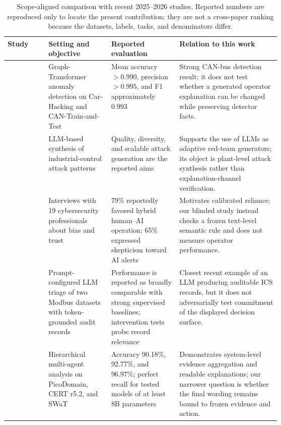 \begin{table}[!htbp]
\centering
\caption{Scope-aligned comparison with recent 2025--2026 studies. Reported numbers are reproduced only to locate the present contribution; they are not a cross-paper ranking because the datasets, labels, tasks, and denominators differ.}
\label{tab:recent-comparison}
\scriptsize
\renewcommand{\arraystretch}{1.04}
\setlength{\tabcolsep}{3pt}
\begin{tabularx}{\linewidth}{@{}p{0.15\linewidth}p{0.23\linewidth}p{0.25\linewidth}X@{}}
\toprule
Study & Setting and objective & Reported evaluation & Relation to this work \\
\midrule
\citet{zhou2025cgts} & Graph-Transformer anomaly detection on Car-Hacking and CAN-Train-and-Test & Mean accuracy $>0.990$, precision $>0.995$, and F1 approximately $0.993$ & Strong CAN-bus detection result; it does not test whether a generated operator explanation can be changed while preserving detector facts. \\
\addlinespace[2pt]
\citet{ahmed2025attackllm} & LLM-based synthesis of industrial-control attack patterns & Quality, diversity, and scalable attack generation are the reported aims & Supports the use of LLMs as adaptive red-team generators; its object is plant-level attack synthesis rather than explanation-channel verification. \\
\addlinespace[2pt]
\citet{hagen2025human} & Interviews with 19 cybersecurity professionals about bias and trust & 79\% reportedly favored hybrid human--AI operation; 65\% expressed skepticism toward AI alerts & Motivates calibrated reliance; our blinded study instead checks a frozen text-level semantic rule and does not measure operator performance. \\
\addlinespace[2pt]
\citet{kong2026llm} & Prompt-configured LLM triage of two Modbus datasets with token-grounded audit records & Performance is reported as broadly comparable with strong supervised baselines; intervention tests probe record relevance & Closest recent example of an LLM producing auditable ICS records, but it does not adversarially test commitment of the displayed decision surface. \\
\addlinespace[2pt]
\citet{ferraro2026multiagent} & Hierarchical multi-agent analysis on PicoDomain, CERT r5.2, and SWaT & Accuracy 90.18\%, 92.77\%, and 96.97\%; perfect recall for tested models of at least 8B parameters & Demonstrates system-level evidence aggregation and readable explanations; our narrower question is whether the final wording remains bound to frozen evidence and action. \\

\end{tabularx}
\end{table}
